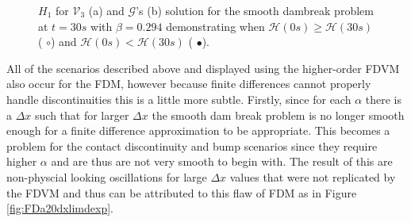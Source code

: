 \documentclass[SingleSpace,12pt,Journal]{Serre_ASCE}
\begin{document}
\begin{figure}
\centering
{}
\caption{$H_1$ for $\mathcal{V}_3$ (a) and $\mathcal{G}$'s (b) solution for the smooth dambreak problem at $t = 30s$ with $\beta = 0.294$ demonstrating when $\mathcal{H}(0s) \ge \mathcal{H}(30s)$ ({\color{red} $\circ$}) and $\mathcal{H}(0s) < \mathcal{H}(30s)$ ({\color{blue} $\bullet$}).}
\label{fig:o3a4dxHallsign}
\end{figure}

All of the scenarios described above and displayed using the higher-order FDVM also occur for the FDM, however because finite differences cannot properly handle discontinuities this is a little more subtle. Firstly, since for each $\alpha$ there is a $\Delta x$ such that for larger $\Delta x$ the smooth dam break problem is no longer smooth enough for a finite difference approximation to be appropriate. This becomes a problem for the contact discontinuity and bump scenarios since they require higher $\alpha$ and are thus are not very smooth to begin with. The result of this are non-physcial looking oscillations for large $\Delta x$ values that were not replicated by the FDVM and thus can be attributed to this flaw of FDM as in Figure \ref{fig:FDa20dxlimdexp}.
\end{document}
